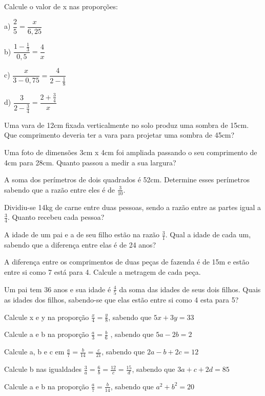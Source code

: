 \begin{exercicios}

	\exitem{} Calcule o valor de x nas proporções:
	\begin{multicols}{4}
		a) $\dfrac{2}{5}=\dfrac{x}{6,25}$
		
		b) $\dfrac{1-\frac{1}{3}}{0,5}=\dfrac{4}{x}$
		
		c) $\dfrac{x}{3 - 0,75}=\dfrac{4}{2-\frac{1}{8}}$
		
		d) $\dfrac{3}{2 - \frac{3}{4}}=\dfrac{2 + \frac{3}{4}}{x}$
	\end{multicols}

	\exitem{} Uma vara de 12cm fixada verticalmente no solo produz uma sombra de 15cm. Que comprimento deveria ter a vara para projetar uma sombra de 45cm?

	\exitem{} Uma foto de dimensões 3cm x 4cm foi ampliada passando o seu comprimento de 4cm para 28cm. Quanto passou a medir a sua largura?

	\exitem{} A soma dos perímetros de dois quadrados é 52cm. Determine esses perímetros sabendo que a razão entre eles é de $\frac{3}{10}$.

	\exitem{} Dividiu-se 14kg de carne entre duas pessoas, sendo a razão entre as partes igual a $\frac{3}{4}$. Quanto recebeu cada pessoa? 

	\exitem{} A idade de um pai e a de seu filho estão na razão $\frac{3}{1}$. Qual a idade de cada um, sabendo que a diferença entre elas é de 24 anos?

	\exitem{} A diferença entre os comprimentos de duas peças de fazenda é de 15m e estão entre si como 7 está para 4. Calcule a metragem de cada peça.

	\exitem{} Um pai tem 36 anos e sua idade é $\frac{4}{5}$ da soma das idades de seus dois filhos. Quais as idades dos filhos, sabendo-se que elas estão entre si como 4 esta para 5?

	\exitem{} Calcule x e y na proporção $\frac{x}{4}=\frac{y}{8}$, sabendo que $5x+3y=33$

	\exitem{} Calcule a e b na proporção $\frac{a}{3}=\frac{b}{6}$ , sabendo que $5a-2b=2$

	\exitem{} Calcule a, b e c em $\frac{a}{7}=\frac{b}{14}=\frac{c}{21}$, sabendo que $2a-b+2c=12$

	\exitem{} Calcule b nas igualdades $\frac{3}{a}=\frac{6}{b}=\frac{12}{c}=\frac{15}{d}$, sabendo que $3a+c+2d=85$

	\exitem{} Calcule a e b na proporção $\frac{a}{7}=\frac{b}{14}$, sabendo que $a^2+b^2=20$


\end{exercicios}

